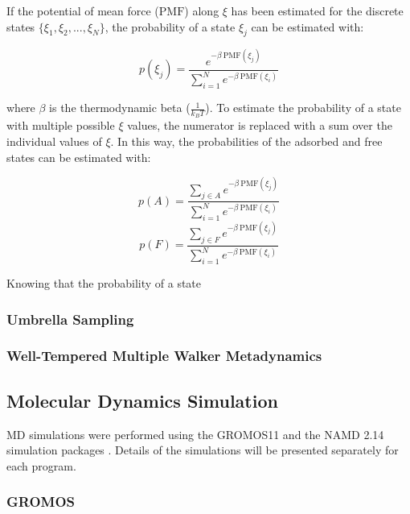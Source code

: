 \documentclass[twoside,twocolumn,9pt]{article}
\begin{document}
If the potential of mean force ($\mathrm{PMF}$) along $\xi$ has been
estimated for the discrete states $\{\xi_1, \xi_2, ..., \xi_N \}$, the
probability of a state $\xi_{j}$ can be estimated with:

\begin{equation}
\label{eq:A-from-PMF}
p(\xi_j) = \frac{e^{-\beta~\mathrm{PMF}(\xi_j)}}{\sum_{i=1}^N e^{-\beta~\mathrm{PMF}(\xi_i)}}
\end{equation}

where $\beta$ is the thermodynamic beta ($\frac{1}{k_{B}T}$). To
estimate the probability of a state with multiple possible $\xi$
values, the numerator is replaced with a sum over the individual
values of $\xi$. In this way, the probabilities of the adsorbed and
free states can be estimated with:

\begin{equation}
\label{eq:Adsorbed}
p(A) = \frac{\sum_{j \in A} e^{-\beta~\mathrm{PMF}(\xi_j)}}{\sum_{i=1}^N e^{-\beta~\mathrm{PMF}(\xi_i)}}
\end{equation}
\begin{equation}
\label{eq:Adsorbed}
p(F) = \frac{\sum_{j \in F} e^{-\beta~\mathrm{PMF}(\xi_j)}}{\sum_{i=1}^N e^{-\beta~\mathrm{PMF}(\xi_i)}}
\end{equation}

Knowing that the probability of a state


\subsubsection{Umbrella Sampling}

\subsubsection{Well-Tempered Multiple Walker Metadynamics}

\subsection{Molecular Dynamics Simulation}

MD simulations were performed using the GROMOS11 \cite{Riniker_2011,
  Schmid_2012} and the NAMD 2.14 simulation packages
\cite{Phillips_2020}.  Details of the simulations will be presented
separately for each program.

\subsubsection{GROMOS}
\end{document}
